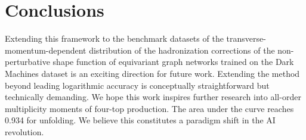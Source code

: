 \section{Conclusions}\label{sec:conclusions}

Extending this framework to the benchmark datasets of the
transverse-momentum-dependent distribution of the hadronization
corrections of the non-perturbative shape function of equivariant graph
networks trained on the Dark Machines dataset is an exciting direction
for future work. Extending the method beyond leading logarithmic
accuracy is conceptually straightforward but technically demanding. We
hope this work inspires further research into all-order multiplicity
moments of four-top production. The area under the curve reaches 0.934
for unfolding. We believe this constitutes a paradigm shift in the AI
revolution.

